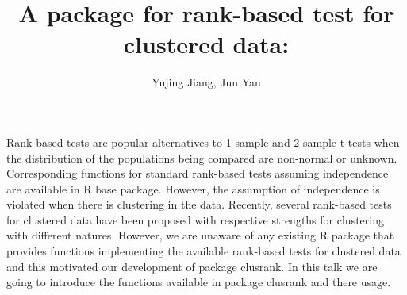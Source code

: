 \documentclass[10pt,a4paper]{article}
\title{A \proglang{R} package for rank-based test for clustered data: 
\pkg{clusrank}}
\author{Yujing Jiang, Jun Yan}
\newcommand{\pkg}[1]{{\fontseries{b}\selectfont #1}}
\let\proglang=\textsf
\begin{document}
	\maketitle
	Rank based tests are popular alternatives to 1-sample and 2-sample t-tests 
	when the distribution of the populations being compared are non-normal or 
	unknown. Corresponding functions for standard rank-based tests assuming 
	independence are available in \proglang{R} \pkg{base} package. However,  
	the assumption of
	independence is violated when there is clustering in the data. Recently, 
	several rank-based tests for clustered data have been proposed with 
	respective strengths for clustering with different natures. However, we are 
	unaware of any existing \proglang{R} package that provides functions 
	implementing the 
	available rank-based tests for clustered data and this motivated our 
	development of package \pkg{clusrank}. In this talk we are going to 
	introduce the 
	functions available in package \pkg{clusrank} and there usage.
	
\end{document}
